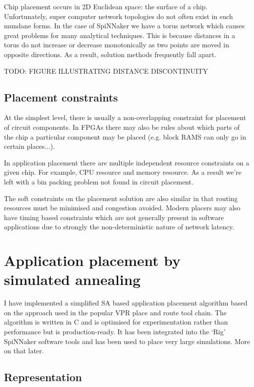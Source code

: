 			Chip placement occurs in 2D Euclidean space: the surface of a chip.
			Unfortunately, super computer network topologies do not often exist in
			such mundane forms. In the case of SpiNNaker we have a torus network
			which causes great problems for many analytical techniques. This is
			because distances in a torus do not increase or decrease monotonically as
			two points are moved in opposite directions. As a result, solution
			methods frequently fall apart.
			
			TODO: FIGURE ILLUSTRATING DISTANCE DISCONTINUITY
		
		\subsection{Placement constraints}
			
			At the simplest level, there is usually a non-overlapping constraint for
			placement of circuit components. In FPGAs there may also be rules about
			which parts of the chip a particular component may be placed (e.g. block
			RAMS can only go in certain places...).
			
			In application placement there are multiple independent resource
			constraints on a given chip. For example, CPU resource and memory
			resource. As a result we're left with a bin packing problem not found in
			circuit placement.
			
			The soft constraints on the placement solution are also similar in that
			routing resources must be minimised and congestion avoided. Modern
			placers may also have timing based constraints which are not generally
			present in software applications due to strongly the non-deterministic
			nature of network latency.
	
	\section{Application placement by simulated annealing}
		
		I have implemented a simplified SA based application placement algorithm
		based on the approach used in the popular VPR place and route tool chain.
		The algorithm is written in C and is optimised for experimentation rather
		than performance but is production-ready. It has been integrated into the
		`Rig' SpiNNaker software tools and has been used to place very large
		simulations. More on that later.
		
		\subsection{Representation}
			
